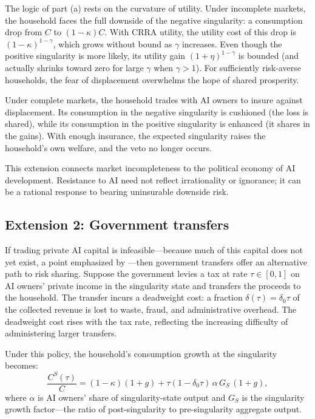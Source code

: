 \documentclass[12pt]{article}
\begin{document}
The logic of part (a) rests on the curvature of utility. Under incomplete markets, the household faces the full downside of the negative singularity: a consumption drop from $C$ to $(1-\kappa)C$. With CRRA utility, the utility cost of this drop is $(1-\kappa)^{1-\gamma}$, which grows without bound as $\gamma$ increases. Even though the positive singularity is more likely, its utility gain $(1+\eta)^{1-\gamma}$ is bounded (and actually shrinks toward zero for large $\gamma$ when $\gamma > 1$). For sufficiently risk-averse households, the fear of displacement overwhelms the hope of shared prosperity.

Under complete markets, the household trades with AI owners to insure against displacement. Its consumption in the negative singularity is cushioned (the loss is shared), while its consumption in the positive singularity is enhanced (it shares in the gains). With enough insurance, the expected singularity raises the household's own welfare, and the veto no longer occurs.

This extension connects market incompleteness to the political economy of AI development. Resistance to AI need not reflect irrationality or ignorance; it can be a rational response to bearing uninsurable downside risk.

\subsection{Extension 2: Government transfers} %

If trading private AI capital is infeasible---because much of this capital does not yet exist, a point emphasized by \citet{GKP2012}---then government transfers offer an alternative path to risk sharing. Suppose the government levies a tax at rate $\tau \in [0,1]$ on AI owners' private income in the singularity state and transfers the proceeds to the household. The transfer incurs a deadweight cost: a fraction $\delta(\tau) = \delta_0 \tau$ of the collected revenue is lost to waste, fraud, and administrative overhead. The deadweight cost rises with the tax rate, reflecting the increasing difficulty of administering larger transfers.

Under this policy, the household's consumption growth at the singularity becomes:
\begin{equation}
  \frac{C^{S}(\tau)}{C} = (1-\kappa)(1+g) + \tau(1-\delta_0\tau)\,\alpha\,G_S\,(1+g), \label{eq:transfers} %
\end{equation}
where $\alpha$ is AI owners' share of singularity-state output and $G_S$ is the singularity growth factor---the ratio of post-singularity to pre-singularity aggregate output.
\end{document}
